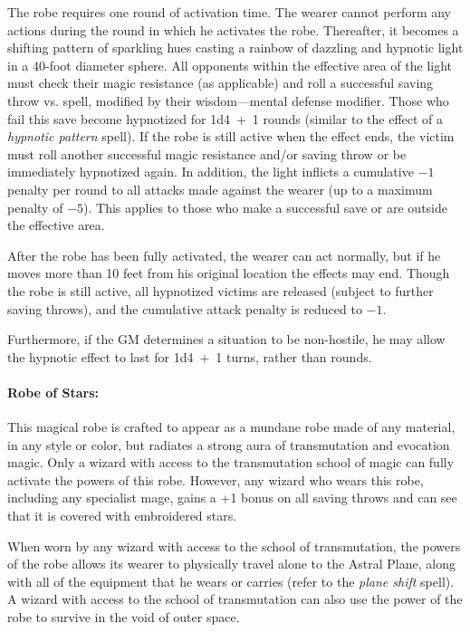 \begin{multicols}{2}
The robe requires one round of activation time.  The wearer cannot perform any actions during the round in which he activates the robe.  Thereafter, it becomes a shifting pattern of sparkling hues casting a rainbow of dazzling and hypnotic light in a 40-foot diameter sphere.  All opponents within the effective area of the light must check their magic resistance (as applicable) and roll a successful saving throw vs. spell, modified by their wisdom---mental defense modifier.  Those who fail this save become hypnotized for 1d4~+~1 rounds (similar to the effect of a \textit{hypnotic pattern} spell).  If the robe is still active when the effect ends, the victim must roll another successful magic resistance and/or saving throw or be immediately hypnotized again.  In addition, the light inflicts a cumulative $-1$ penalty per round to all attacks made against the wearer (up to a maximum penalty of $-5$).  This applies to those who make a successful save or are outside the effective area.  

After the robe has been fully activated, the wearer can act normally, but if he moves more than 10 feet from his original location the effects may end.  Though the robe is still active, all hypnotized victims are released (subject to further saving throws), and the cumulative attack penalty is reduced to $-1$.

Furthermore, if the GM determines a situation to be non-hostile, he may allow the hypnotic effect to last for 1d4~+~1 turns, rather than rounds.  
 
\paragraph{Robe of Stars:} This magical robe is crafted to appear as a mundane robe made of any material, in any style or color, but radiates a strong aura of transmutation and evocation magic.  Only a wizard with access to the transmutation school of magic can fully activate the powers of this robe.  However, any wizard who wears this robe, including any specialist mage, gains a +1 bonus on all saving throws and can see that it is covered with embroidered stars.  

When worn by any wizard with access to the school of transmutation, the powers of the robe allows its wearer to physically travel alone to the Astral Plane, along with all of the equipment that he wears or carries (refer to the \textit{plane shift} spell).  A wizard with access to the school of transmutation can also use the power of the robe to survive in the void of outer space.  


\end{multicols}
